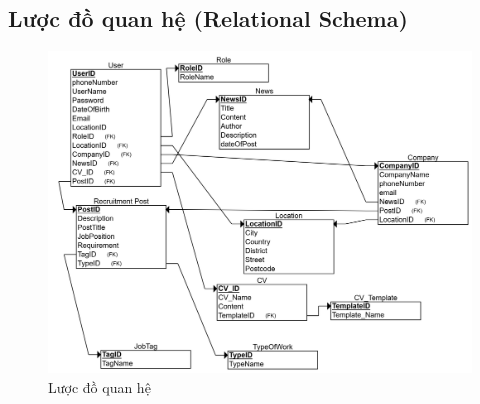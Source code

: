 \subsection{Lược đồ quan hệ (Relational Schema) }

\begin{figure}[H]

	\centering
    \includegraphics[scale=0.1]{img/Relational_Schema.png}
    \caption{Lược đồ quan hệ}
		
\end{figure}


